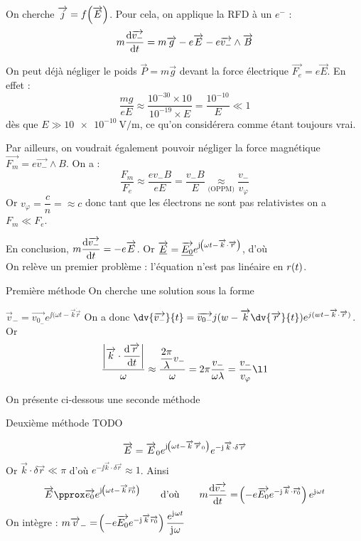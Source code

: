 \documentclass[a4paper,french,bookmarks]{book}
\begin{document}
    On cherche $\overrightarrow{j} = f\!\left(\overrightarrow{E}\right)$. Pour cela, on applique la RFD à un $e^-$ :
    \[ m \dfrac{\mathrm d \overrightarrow{v_-}}{\mathrm d t} = m\overrightarrow{g} - e\overrightarrow{E} - e\overrightarrow{v_-} \wedge \overrightarrow{B}\]
    \begin{enumerate}
        \itt On peut déjà négliger le poids $\vec{P} = m\vec g$ devant la force électrique $\vec{F_e} = e\vec E$. En effet :
        \[ \dfrac{mg}{eE} \approx \dfrac{10^{-30} \times 10}{10^{-19} \times E} = \dfrac{10^{-10}}{E} \ll 1 \]
        dès que $E \gg \qty{10e-10}{\volt \per \meter}$, ce qu'on considérera comme étant toujours vrai.
        
        \itt Par ailleurs, on voudrait également pouvoir négliger la force magnétique $\vec{F_m} = e\vec{v_-}\wedge B$. On a :
        \[ \dfrac{F_m}{F_e} \approx \dfrac{ev_-B}{eE} = \dfrac{v_-B}{E} \underset{\text{(OPPM)}}{\approx} \dfrac{v_-}{v_\varphi} \]
        Or $v_\varphi = \dfrac{c}{n} = \approx c$ donc tant que les électrons ne sont pas relativistes on a $F_m \ll F_e$.
    \end{enumerate}
    En conclusion, $m\dfrac{\mathrm d \overrightarrow{v_-}}{\mathrm d t} = -e\overrightarrow{E}$. Or $\overrightarrow{\underline E} = \overrightarrow{\underline{E_0}} e^{\mathrm{j\mkern1mu} \!\left(\omega t - \overrightarrow{k} \cdot \overrightarrow{r}\right)}$, d'où
    \[ \]
    On relève un premier problème : l'équation n'est pas linéaire en $r\!\left(t\right)$.
    


    \newcommand{\deriv}[1]{\dv{#1}{t}}
    \newcommand{\derivv}[1]{\dfrac{\mathrm{d}^2 #1}{\mathrm{d}t^2}}

    \begin{form}{Première méthode}{}
        On cherche une solution sous la forme 
        
        $\vec v_- = \vec{v_{0_-}} e^{\jj(\omega t-\vec{k}\dot \vec r}$
        \newline 
        On a donc $\deriv{\vec{ v_-}} = \vec{ v_{0-}} j(w- \vec k \deriv{\vec r})e^{j(wt-\vec k \cdot \vec r)}$. Or
        \[ \dfrac{\mod{\vec k \cdot \dfrac{\dif \vec r}{\dif t}}}{\omega} \approx \dfrac{\dfrac{2\pi}{\lambda} v_-}{\omega} = 2\pi \dfrac{v_-}{\omega \lambda} = \dfrac{v_-}{v_\varphi} \l 1\]
    \end{form}
    
    On présente ci-dessous une seconde méthode

    \begin{form}{Deuxième méthode}{}
        TODO 
        
        \[ \overrightarrow{E} = \overrightarrow{E}_0 e^{\mathrm{j\mkern1mu}\!\left(\omega t - \overrightarrow{k} \overrightarrow{r}_0\right)}e^{-\mathrm{j\mkern1mu} \overrightarrow{k} \cdot \delta \overrightarrow{r}}\]
        Or $\vec k \cdot \delta \vec r \ll \pi$ d'où $e^{-\jj \vec k \cdot \delta \vec r} \approx 1$. Ainsi
        \[ \vec E \pprox \vec{e_0}e^{\jj\p{\omega t - \vec k \vec{r_0}}} \qquad\text{d'où}\qquad m\dfrac{\dif\vec{v_-}}{\dif t} = \p{-e\vec{E_0}e^{-\jj\vec k \cdot \vec{r_0}}}e^{\jj \omega t}\]
        On intègre : \qquad $m\overrightarrow{v}_- = \!\left(-e\overrightarrow{E_0}e^{-\mathrm{j\mkern1mu} \overrightarrow{k} \overrightarrow{r_0}}\right)\dfrac{e^{\mathrm{j\mkern1mu} \omega t}}{\mathrm{j\mkern1mu} \omega}$
    \end{form}
    
\end{document}
